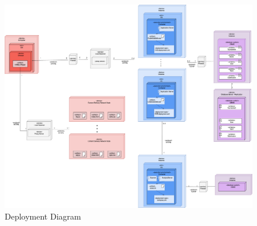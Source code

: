\begin{figure}[H]
    \centering
    \includegraphics[scale=0.25]{Images/DD-deployment.drawio.png}
    \caption{Deployment Diagram}
\end{figure}

